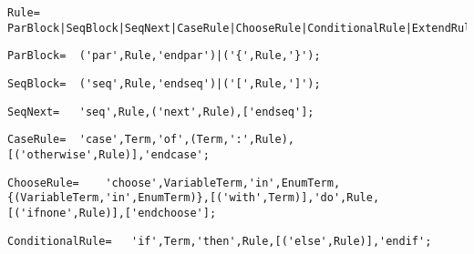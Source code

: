 \documentclass{article}
\begin{document}
    \begin{flushleft}
    \begin{lstlisting}[mathescape=true, breaklines=true]
     Rule= 	ParBlock|SeqBlock|SeqNext|CaseRule|ChooseRule|ConditionalRule|ExtendRule|ForAllRule|ImportRule|IterateRule|LetRule|TurboReturnRule|WhileRule|UpdateRule|SkipRule|CallRule|LocalRule|PrintRule;
    \end{lstlisting}
    \end{flushleft}
    \begin{flushleft}
    \begin{lstlisting}[mathescape=true, breaklines=true]
     ParBlock= 	('par',Rule,'endpar')|('{',Rule,'}');
    \end{lstlisting}
    \end{flushleft}
    \begin{flushleft}
    \begin{lstlisting}[mathescape=true, breaklines=true]
     SeqBlock= 	('seq',Rule,'endseq')|('[',Rule,']');
    \end{lstlisting}
    \end{flushleft}
    \begin{flushleft}
    \begin{lstlisting}[mathescape=true, breaklines=true]
     SeqNext= 	'seq',Rule,('next',Rule),['endseq'];
    \end{lstlisting}
    \end{flushleft}
    \begin{flushleft}
    \begin{lstlisting}[mathescape=true, breaklines=true]
     CaseRule= 	'case',Term,'of',(Term,':',Rule),[('otherwise',Rule)],'endcase';
    \end{lstlisting}
    \end{flushleft}
    \begin{flushleft}
    \begin{lstlisting}[mathescape=true, breaklines=true]
     ChooseRule= 	'choose',VariableTerm,'in',EnumTerm,{(VariableTerm,'in',EnumTerm)},[('with',Term)],'do',Rule,[('ifnone',Rule)],['endchoose'];
    \end{lstlisting}
    \end{flushleft}
    \begin{flushleft}
    \begin{lstlisting}[mathescape=true, breaklines=true]
     ConditionalRule= 	'if',Term,'then',Rule,[('else',Rule)],'endif';
    \end{lstlisting}
    \end{flushleft}
\end{document}
